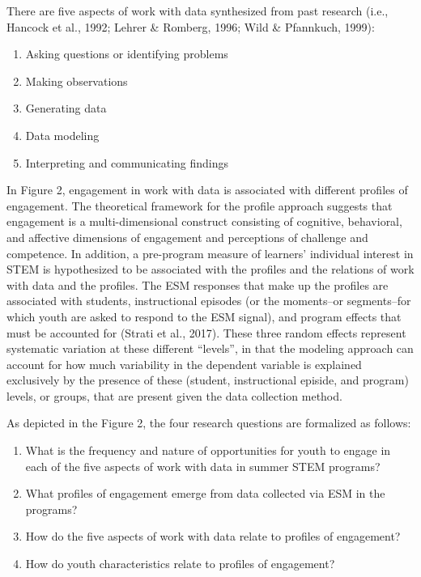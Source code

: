 \documentclass[]{msu-thesis}
\providecommand{\tightlist}{%
  \setlength{\itemsep}{0pt}\setlength{\parskip}{0pt}}
\theoremstyle{definition}
\theoremstyle{definition}
\theoremstyle{definition}
\theoremstyle{remark}
\begin{document}
There are five aspects of work with data synthesized from past research
(i.e., Hancock et al., 1992; Lehrer \& Romberg, 1996; Wild \& Pfannkuch,
1999):

\begin{enumerate}
\def\labelenumi{\arabic{enumi}.}
\tightlist
\item
  Asking questions or identifying problems
\item
  Making observations
\item
  Generating data
\item
  Data modeling
\item
  Interpreting and communicating findings
\end{enumerate}

In Figure 2, engagement in work with data is associated with different
profiles of engagement. The theoretical framework for the profile
approach suggests that engagement is a multi-dimensional construct
consisting of cognitive, behavioral, and affective dimensions of
engagement and perceptions of challenge and competence. In addition, a
pre-program measure of learners' individual interest in STEM is
hypothesized to be associated with the profiles and the relations of
work with data and the profiles. The ESM responses that make up the
profiles are associated with students, instructional episodes (or the
moments--or segments--for which youth are asked to respond to the ESM
signal), and program effects that must be accounted for (Strati et al.,
2017). These three random effects represent systematic variation at
these different ``levels'', in that the modeling approach can account
for how much variability in the dependent variable is explained
exclusively by the presence of these (student, instructional episide,
and program) levels, or groups, that are present given the data
collection method.

As depicted in the Figure 2, the four research questions are formalized
as follows:

\begin{enumerate}
\def\labelenumi{\arabic{enumi}.}
\tightlist
\item
  What is the frequency and nature of opportunities for youth to engage
  in each of the five aspects of work with data in summer STEM programs?
\item
  What profiles of engagement emerge from data collected via ESM in the
  programs?
\item
  How do the five aspects of work with data relate to profiles of
  engagement?
\item
  How do youth characteristics relate to profiles of engagement?
\end{enumerate}
\end{document}
